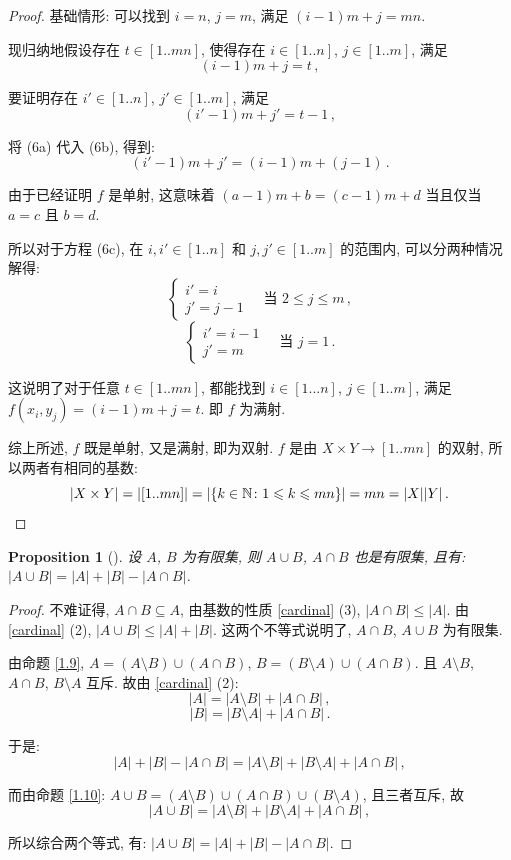 \documentclass[UTF8]{ctexart}
\theoremstyle{mystyle}
\newtheorem{proposition}{Proposition}[section]
\theoremstyle{myremark}
\theoremstyle{plain}
\newcommand{\N}{\mathbb N}
\DeclarePairedDelimiter\set{\{}{\}}
\begin{document}
\begin{proof}
    基础情形: 可以找到 $ i = n $, $ j = m $, 满足 $ (i - 1) m + j = m n $.

    现归纳地假设存在 $ t \in [1 .. mn] $, 使得存在 $ i \in [1 .. n] $, $ j \in [1 .. m] $, 满足 \[ (i - 1) m + j = t \tag{6a} \,,\] 
    
    要证明存在 $ i' \in [1 .. n] $, $ j' \in [1 .. m] $, 满足 \[ (i' - 1) m + j' = t - 1 \tag{6b} \,,\]

    将 (6a) 代入 (6b), 得到:
    \[ (i' - 1) m + j' = (i - 1) m + (j - 1) \tag{6c} \,.\]

    由于已经证明 $ f $ 是单射, 这意味着 $ (a - 1) m + b = (c - 1) m + d $ 当且仅当 $ a = c $ 且 $ b = d $. 
    
    所以对于方程 (6c), 在 $ i, i' \in [1 .. n] $ 和 $ j, j' \in [1 .. m] $ 的范围内, 可以分两种情况解得:
    \[ \begin{cases}
        i' = i \\
        j' = j - 1
    \end{cases} \quad \text{当 } 2 \leqslant j \leqslant m \,,\]
    \[ \begin{cases}
        i' = i - 1 \\
        j' = m
    \end{cases} \quad \text{当 } j = 1 \,.\]

    这说明了对于任意 $ t \in [1 .. m n] $, 都能找到 $ i \in [1 ... n] $, $ j \in [1 .. m] $, 满足 $ f(x_i, y_j) = (i - 1) m + j = t $. 即 $ f $ 为满射.

    综上所述, $ f $ 既是单射, 又是满射, 即为双射. $ f $ 是由 $ X \times Y \to [1 .. mn] $ 的双射, 所以两者有相同的基数:
    \[ |X \times Y| = |[1 .. mn]| = |\set{k \in \N \colon 1 \leqslant k \leqslant mn}| = m n = |X| |Y| \,.\]
\end{proof}


\begin{proposition}[]
    设 $ A $, $ B $ 为有限集, 则 $ A \cup B $, $ A \cap B $ 也是有限集, 且有: $ |A \cup B| = |A| + |B| - |A \cap B| $.
\end{proposition}

\begin{proof}
    不难证得, $ A \cap B \subseteq A $, 由基数的性质 \ref{cardinal} (3), $ |A \cap B| \leqslant |A| $. 由 \ref{cardinal} (2), $ |A \cup B| \leqslant |A| + |B| $. 这两个不等式说明了, $ A \cap B $, $ A \cup B $ 为有限集.

    由命题 \ref{1.9}, $ A = (A \setminus B) \cup (A \cap B) $, $ B = (B \setminus A) \cup (A \cap B) $. 且 $ A \setminus B $, $ A \cap B $, $ B \setminus A $ 互斥. 故由 \ref{cardinal} (2):
    \[ |A| = |A \setminus B| + |A \cap B| \,,\]
    \[ |B| = |B \setminus A| + |A \cap B| \,.\]

    于是:
    \[ |A| + |B| - |A \cap B| = |A \setminus B| + |B \setminus A| + |A \cap B| \,,\]

    而由命题 \ref{1.10}: $ A \cup B = (A \setminus B) \cup (A \cap B) \cup (B \setminus A) $, 且三者互斥, 故
    \[ |A \cup B| = |A \setminus B| + |B \setminus A| + |A \cap B| \,,\]

    所以综合两个等式, 有: $ |A \cup B| = |A| + |B| - |A \cap B| $.
\end{proof}
\end{document}

